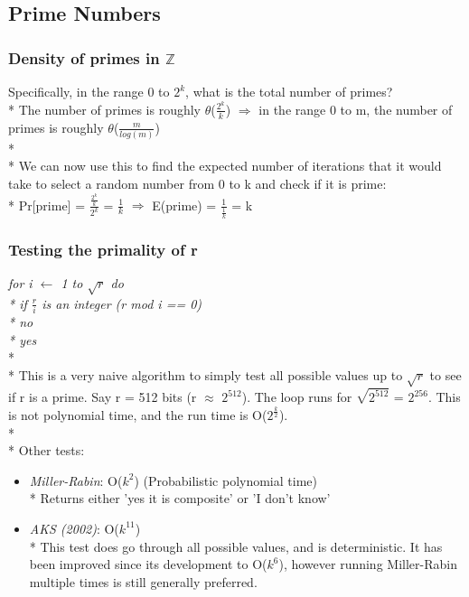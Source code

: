 \documentclass[11pt]{article}
\begin{document}
\subsection{Prime Numbers}
\subsubsection{Density of primes in $\mathbb{Z}$}
Specifically, in the range 0 to $2^k$, what is the total number of primes?\\*
The number of primes is roughly $\theta$($\frac{2^k}{k}$) $\Longrightarrow$ in
the range 0 to m, the number of primes is roughly
$\theta$($\frac{m}{log(m)}$)\\*\\* We can now use this to find the expected
number of iterations that it would take to select a random number from 0 to k and check if it is prime:\\*
Pr[prime] = $\frac{\frac{2^k}{k}}{2^k}$ = $\frac{1}{k}$ $\Longrightarrow$
E(prime) = $\frac{1}{\frac{1}{k}}$ = k

\subsubsection{Testing the primality of r}
\emph{for i $\leftarrow$ 1 to $\sqrt{r}$ do\\*
\indent if $\frac{r}{i}$ is an integer (r mod i == 0)\\*
\indent \indent no\\*
yes}\\*\\*
This is a very naive algorithm to simply test all possible values up to
$\sqrt{r}$ to see if r is a prime.  Say r = 512 bits (r $\approx$ $2^{512}$). 
The loop runs for $\sqrt{2^{512}}$ = $2^{256}$.  This is not polynomial time,
and the run time is O($2^\frac{k}{2}$).\\*\\*
Other tests:
\begin{itemize}
  \item \emph{Miller-Rabin}: O($k^2$) (Probabilistic polynomial time)\\*
  \indent Returns either 'yes it is composite' or 'I don't know'
  \item \emph{AKS (2002)}: O($k^11$)\\*
  \indent This test does go through all possible values, and is deterministic.
  It has been improved since its development to O($k^6$), however running
  Miller-Rabin multiple times is still generally preferred.
\end{itemize}
\end{document}
